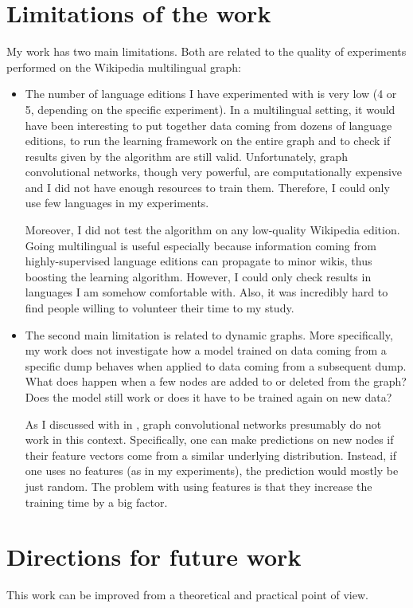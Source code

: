     \section{Limitations of the work}
        My work has two main limitations. Both are related to the quality of experiments performed on the Wikipedia multilingual graph:
        \begin{itemize}
            \item The number of language editions I have experimented with is very low (4 or 5, depending on the specific experiment). In a multilingual setting, it would have been interesting to put together data coming from dozens of language editions, to run the learning framework on the entire graph and to check if results given by the algorithm are still valid. Unfortunately, graph convolutional networks, though very powerful, are computationally expensive and I did not have enough resources to train them. Therefore, I could only use few languages in my experiments.
            
            Moreover, I did not test the algorithm on any low-quality Wikipedia edition. Going multilingual is useful especially because information coming from highly-supervised language editions can propagate to minor wikis, thus boosting the learning algorithm. However, I could only check results in languages I am somehow comfortable with. Also, it was incredibly hard to find people willing to volunteer their time to my study.
            \item The second main limitation is related to dynamic graphs. More specifically, my work does not investigate how a model trained on data coming from a specific dump behaves when applied to data coming from a subsequent dump. What does happen when a few nodes are added to or deleted from the graph? Does the model still work or does it have to be trained again on new data?
            
            As I discussed with \citeauthor{KipfPrivate} in \cite{KipfPrivate}, graph convolutional networks presumably do not work in this context. Specifically, one can make predictions on new nodes if their feature vectors come from a similar underlying distribution. Instead, if one uses no features (as in my experiments), the prediction would mostly be just random. The problem with using features is that they increase the training time by a big factor.
        \end{itemize}
    \section{Directions for future work}
        This work can be improved from a theoretical and practical point of view.
